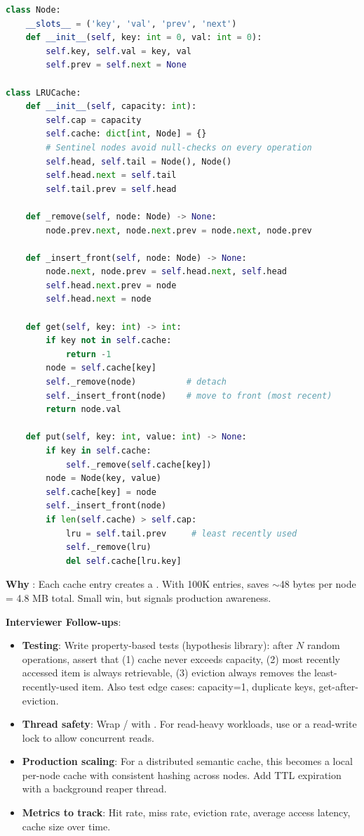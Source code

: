 \begin{lstlisting}[language=Python]
class Node:
    __slots__ = ('key', 'val', 'prev', 'next')
    def __init__(self, key: int = 0, val: int = 0):
        self.key, self.val = key, val
        self.prev = self.next = None

class LRUCache:
    def __init__(self, capacity: int):
        self.cap = capacity
        self.cache: dict[int, Node] = {}
        # Sentinel nodes avoid null-checks on every operation
        self.head, self.tail = Node(), Node()
        self.head.next = self.tail
        self.tail.prev = self.head

    def _remove(self, node: Node) -> None:
        node.prev.next, node.next.prev = node.next, node.prev

    def _insert_front(self, node: Node) -> None:
        node.next, node.prev = self.head.next, self.head
        self.head.next.prev = node
        self.head.next = node

    def get(self, key: int) -> int:
        if key not in self.cache:
            return -1
        node = self.cache[key]
        self._remove(node)          # detach
        self._insert_front(node)    # move to front (most recent)
        return node.val

    def put(self, key: int, value: int) -> None:
        if key in self.cache:
            self._remove(self.cache[key])
        node = Node(key, value)
        self.cache[key] = node
        self._insert_front(node)
        if len(self.cache) > self.cap:
            lru = self.tail.prev     # least recently used
            self._remove(lru)
            del self.cache[lru.key]
\end{lstlisting}

\textbf{Why }: Each cache entry creates a . With 100K entries,  saves $\sim$48 bytes per node = 4.8 MB total. Small win, but signals production awareness.

\textbf{Interviewer Follow-ups}:
\begin{itemize}[leftmargin=*]
    \item \textbf{Testing}: Write property-based tests (hypothesis library): after $N$ random  operations, assert that (1) cache never exceeds capacity, (2) most recently accessed item is always retrievable, (3) eviction always removes the least-recently-used item. Also test edge cases: capacity=1, duplicate keys, get-after-eviction.
    \item \textbf{Thread safety}: Wrap / with . For read-heavy workloads, use  or a read-write lock to allow concurrent reads.
    \item \textbf{Production scaling}: For a distributed semantic cache, this becomes a local per-node cache with consistent hashing across nodes. Add TTL expiration with a background reaper thread.
    \item \textbf{Metrics to track}: Hit rate, miss rate, eviction rate, average access latency, cache size over time.
\end{itemize}

